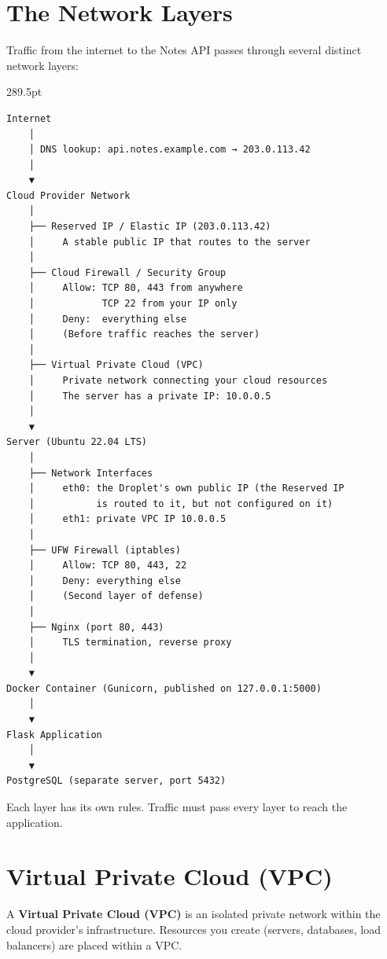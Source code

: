 \setcounter{section}{0}
\section{The Network Layers}\label{22-network-configuration:221-the-network-layers}

Traffic from the internet to the Notes API passes through several distinct network layers:

\begin{diagrambox}[short]{289.5pt}
\begin{Verbatim}[fontsize=\fontsize{9.0}{8.55}\selectfont]
Internet
    │
    │ DNS lookup: api.notes.example.com → 203.0.113.42
    │
    ▼
Cloud Provider Network
    │
    ├── Reserved IP / Elastic IP (203.0.113.42)
    │     A stable public IP that routes to the server
    │
    ├── Cloud Firewall / Security Group
    │     Allow: TCP 80, 443 from anywhere
    │            TCP 22 from your IP only
    │     Deny:  everything else
    │     (Before traffic reaches the server)
    │
    ├── Virtual Private Cloud (VPC)
    │     Private network connecting your cloud resources
    │     The server has a private IP: 10.0.0.5
    │
    ▼
Server (Ubuntu 22.04 LTS)
    │
    ├── Network Interfaces
    │     eth0: the Droplet's own public IP (the Reserved IP
    │           is routed to it, but not configured on it)
    │     eth1: private VPC IP 10.0.0.5
    │
    ├── UFW Firewall (iptables)
    │     Allow: TCP 80, 443, 22
    │     Deny: everything else
    │     (Second layer of defense)
    │
    ├── Nginx (port 80, 443)
    │     TLS termination, reverse proxy
    │
    ▼
Docker Container (Gunicorn, published on 127.0.0.1:5000)
    │
    ▼
Flask Application
    │
    ▼
PostgreSQL (separate server, port 5432)
\end{Verbatim}
\end{diagrambox}

\noindent{}Each layer has its own rules. Traffic must pass every layer to reach the application.

\setcounter{section}{1}
\section{Virtual Private Cloud (VPC)}\label{22-network-configuration:222-virtual-private-cloud-vpc}

A \textbf{Virtual Private Cloud (VPC)} is an isolated private network within the cloud provider's infrastructure. Resources you create (servers, databases, load balancers) are placed within a VPC.

